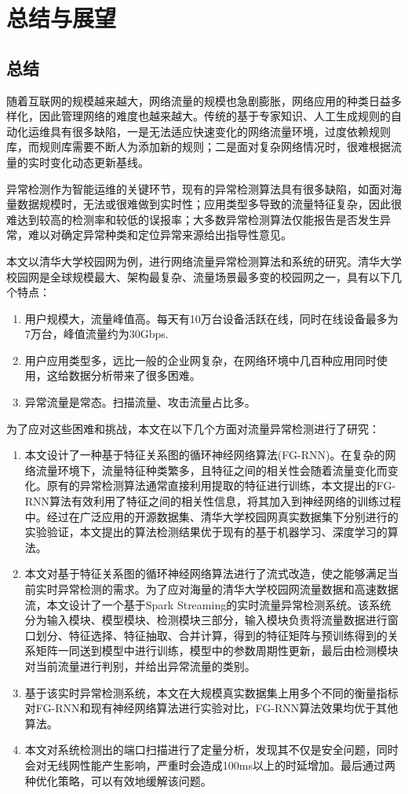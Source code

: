 \chapter{总结与展望}
\section{总结}
随着互联网的规模越来越大，网络流量的规模也急剧膨胀，网络应用的种类日益多样化，因此管理网络的难度也越来越大。传统的基于专家知识、人工生成规则的自动化运维具有很多缺陷，一是无法适应快速变化的网络流量环境，过度依赖规则库，而规则库需要不断人为添加新的规则；二是面对复杂网络情况时，很难根据流量的实时变化动态更新基线。

异常检测作为智能运维的关键环节，现有的异常检测算法具有很多缺陷，如面对海量数据规模时，无法或很难做到实时性；应用类型多导致的流量特征复杂，因此很难达到较高的检测率和较低的误报率；大多数异常检测算法仅能报告是否发生异常，难以对确定异常种类和定位异常来源给出指导性意见。

本文以清华大学校园网为例，进行网络流量异常检测算法和系统的研究。清华大学校园网是全球规模最大、架构最复杂、流量场景最多变的校园网之一，具有以下几个特点：
\begin{enumerate}
    \item 用户规模大，流量峰值高。每天有10万台设备活跃在线，同时在线设备最多为7万台，峰值流量约为30Gbps.
    \item	用户应用类型多，远比一般的企业网复杂，在网络环境中几百种应用同时使用，这给数据分析带来了很多困难。
    \item	异常流量是常态。扫描流量、攻击流量占比多。
\end{enumerate}

为了应对这些困难和挑战，本文在以下几个方面对流量异常检测进行了研究：
\begin{enumerate}
    \item 本文设计了一种基于特征关系图的循环神经网络算法(FG-RNN)。在复杂的网络流量环境下，流量特征种类繁多，且特征之间的相关性会随着流量变化而变化。原有的异常检测算法通常直接利用提取的特征进行训练，本文提出的FG-RNN算法有效利用了特征之间的相关性信息，将其加入到神经网络的训练过程中。经过在广泛应用的开源数据集、清华大学校园网真实数据集下分别进行的实验验证，本文提出的算法检测结果优于现有的基于机器学习、深度学习的算法。
    \item 本文对基于特征关系图的循环神经网络算法进行了流式改造，使之能够满足当前实时异常检测的需求。为了应对海量的清华大学校园网流量数据和高速数据流，本文设计了一个基于Spark Streaming的实时流量异常检测系统。该系统分为输入模块、模型模块、检测模块三部分，输入模块负责将流量数据进行窗口划分、特征选择、特征抽取、合并计算，得到的特征矩阵与预训练得到的关系矩阵一同送到模型中进行训练，模型中的参数周期性更新，最后由检测模块对当前流量进行判别，并给出异常流量的类别。
    \item 基于该实时异常检测系统，本文在大规模真实数据集上用多个不同的衡量指标对FG-RNN和现有神经网络算法进行实验对比，FG-RNN算法效果均优于其他算法。
    \item 本文对系统检测出的端口扫描进行了定量分析，发现其不仅是安全问题，同时会对无线网性能产生影响，严重时会造成100ms以上的时延增加。最后通过两种优化策略，可以有效地缓解该问题。
\end{enumerate}

